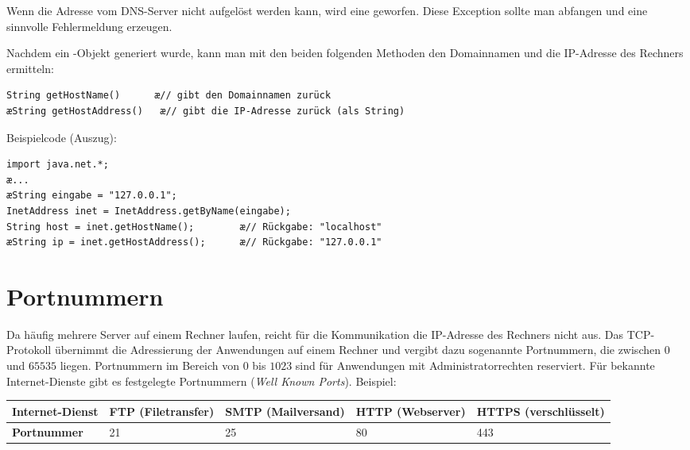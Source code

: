 Wenn die Adresse vom DNS-Server nicht aufgelöst werden kann, wird eine
 geworfen. Diese Exception sollte man abfangen und
eine sinnvolle Fehlermeldung erzeugen.

Nachdem ein -Objekt generiert wurde, kann man mit den beiden
folgenden Methoden den Domainnamen und die IP-Adresse des Rechners ermitteln:

\begin{lstlisting}
String getHostName()      æ// gibt den Domainnamen zurück
æString getHostAddress()   æ// gibt die IP-Adresse zurück (als String)
\end{lstlisting}

Beispielcode (Auszug):

\begin{lstlisting}
import java.net.*;
æ...
æString eingabe = "127.0.0.1";
InetAddress inet = InetAddress.getByName(eingabe);
String host = inet.getHostName();        æ// Rückgabe: "localhost"
æString ip = inet.getHostAddress();	     æ// Rückgabe: "127.0.0.1"
\end{lstlisting}
		

\section{Portnummern}

Da häufig mehrere Server auf einem Rechner laufen, reicht für die Kommunikation
die IP-Adresse des Rechners nicht aus. Das TCP-Protokoll übernimmt die
Adressierung der Anwendungen auf einem Rechner und vergibt dazu sogenannte
Portnummern, die zwischen $0$ und $65535$ liegen. Portnummern im Bereich von $0$ bis
$1023$ sind für Anwendungen mit Administratorrechten reserviert. Für bekannte
Internet-Dienste gibt es festgelegte Portnummern (\emph{Well Known Ports}).
Beispiel:

\begin{center}
\begin{minipage}{0.95\textwidth}
\bgroup
\def\arraystretch{1.2}
\begin{tabularx}{\textwidth}{|X|X|X|X|X|}
\hline
\textbf{Internet-Dienst} &
FTP (Filetransfer) & SMTP (Mailversand) & HTTP (Webserver) & HTTPS (verschlüsselt)
\\ \hline
\textbf{Portnummer} &
21 & 25 & 80 & 443
\\ \hline
\end{tabularx}
\egroup
\end{minipage}
\end{center}
